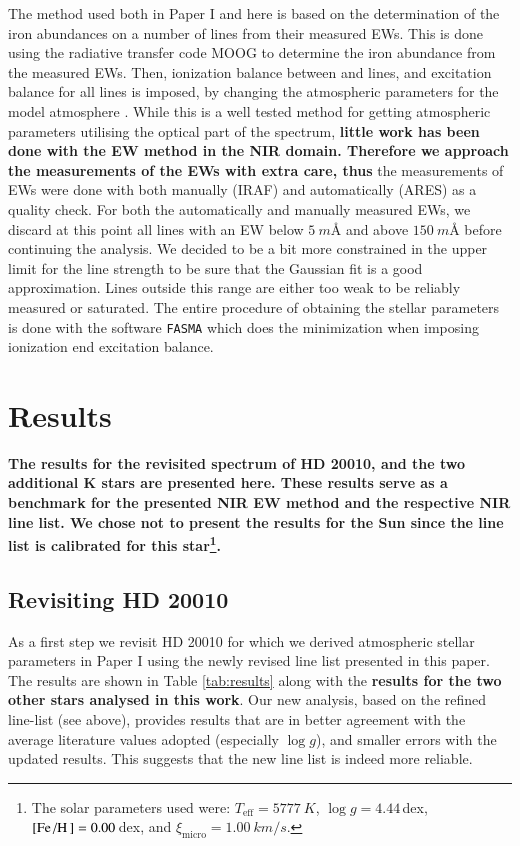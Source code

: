 \documentclass{aa}
\begin{document}
The method used both in Paper I and here is based on the determination of the iron abundances on a
number of lines from their measured EWs. This is done using the radiative transfer code MOOG
\citep{Sneden1973} to determine the iron abundance from the measured EWs. Then, ionization balance
between  and  lines, and excitation balance for all  lines is
imposed, by changing the atmospheric parameters for the model atmosphere \citep[][ATLAS9 is used
here]{Kurucz1993}. While this is a well tested method for getting atmospheric parameters utilising
the optical part of the spectrum, {\bf little work has been done with the EW method in the NIR
domain. Therefore we approach the measurements of the EWs with extra care, thus} the measurements of
EWs were done with both manually (IRAF) and automatically (ARES) as a quality check. For both the
automatically and manually measured EWs, we discard at this point all lines with an EW below
$\SI{5}{m}$\AA{} and above $\SI{150}{m}$\AA{} before continuing the analysis. We decided to be a bit
more constrained in the upper limit for the line strength to be sure that the Gaussian fit is a good
approximation. Lines outside this range are either too weak to be reliably measured or saturated.
The entire procedure of obtaining the stellar parameters is done with the software \texttt{FASMA}
\citep{Andreasen2017a} which does the minimization when imposing ionization end excitation balance.




\section{Results}
\label{sec:results}

{\bf The results for the revisited spectrum of HD 20010, and the two additional K stars are
presented here. These results serve as a benchmark for the presented NIR EW method and the
respective NIR line list. We chose not to present the results for the Sun since the line list is
calibrated for this star\footnote{The solar parameters used were: $T_\mathrm{eff}=\SI{5777}{K}$,
$\log g=4.44\,$dex, $[\ion{Fe}/\ion{H}]=0.00\,$dex, and $\xi_\mathrm{micro}=\SI{1.00}{km/s}$.}.}

\subsection{Revisiting HD 20010}
\label{sec:hd20010}

As a first step we revisit HD 20010 for which we derived atmospheric stellar parameters in Paper I
using the newly revised line list presented in this paper. The results are shown in Table
\ref{tab:results} along with the {\bf results for the two other stars analysed in this work}. Our
new analysis, based on the refined line-list (see above), provides results that are in better
agreement with the average literature values adopted (especially $\log g$), and smaller errors with
the updated results. This suggests that the new line list is indeed more reliable.
\end{document}
